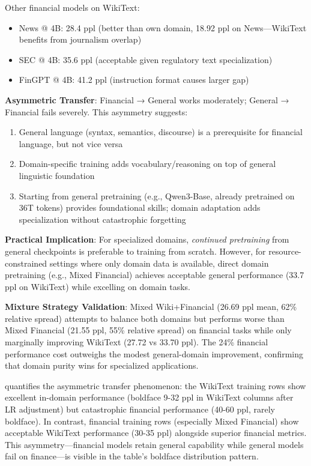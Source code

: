 Other financial models on WikiText:
\begin{itemize}
\item News @ 4B: 28.4 ppl (better than own domain, 18.92 ppl on News—WikiText benefits from journalism overlap)
\item SEC @ 4B: 35.6 ppl (acceptable given regulatory text specialization)
\item FinGPT @ 4B: 41.2 ppl (instruction format causes larger gap)
\end{itemize}

\textbf{Asymmetric Transfer}: Financial → General works moderately; General → Financial fails severely. This asymmetry suggests:
\begin{enumerate}
\item General language (syntax, semantics, discourse) is a prerequisite for financial language, but not vice versa
\item Domain-specific training adds vocabulary/reasoning on top of general linguistic foundation
\item Starting from general pretraining (e.g., Qwen3-Base, already pretrained on 36T tokens) provides foundational skills; domain adaptation adds specialization without catastrophic forgetting
\end{enumerate}

\textbf{Practical Implication}: For specialized domains, \textit{continued pretraining} from general checkpoints is preferable to training from scratch. However, for resource-constrained settings where only domain data is available, direct domain pretraining (e.g., Mixed Financial) achieves acceptable general performance (33.7 ppl on WikiText) while excelling on domain tasks.

\textbf{Mixture Strategy Validation}: Mixed Wiki+Financial (26.69 ppl mean, 62\% relative spread) attempts to balance both domains but performs worse than Mixed Financial (21.55 ppl, 55\% relative spread) on financial tasks while only marginally improving WikiText (27.72 vs 33.70 ppl). The 24\% financial performance cost outweighs the modest general-domain improvement, confirming that domain purity wins for specialized applications.



 quantifies the asymmetric transfer phenomenon: the WikiText training rows show excellent in-domain performance (boldface 9-32 ppl in WikiText columns after LR adjustment) but catastrophic financial performance (40-60 ppl, rarely boldface). In contrast, financial training rows (especially Mixed Financial) show acceptable WikiText performance (30-35 ppl) alongside superior financial metrics. This asymmetry—financial models retain general capability while general models fail on finance—is visible in the table's boldface distribution pattern.

